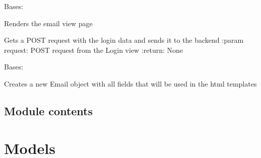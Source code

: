 \documentclass[letterpaper,10pt,english]{sphinxmanual}
\begin{document}

\begin{fulllineitems}
\label{push_email:push_email.views.EmailView}
Bases: 

Renders the email view page

\begin{fulllineitems}
\label{push_email:push_email.views.EmailView.post}
Gets a POST request with the login data and sends it to the backend
:param request: POST request from the Login view
:return: None

\end{fulllineitems}


\begin{fulllineitems}
\label{push_email:push_email.views.EmailView.template_name}
\end{fulllineitems}


\end{fulllineitems}


\begin{fulllineitems}
\label{push_email:push_email.views.FullEmail}
Bases: 

Creates a new Email object with all fields that will be used in the html templates

\end{fulllineitems}



\section{Module contents}
\label{push_email:module-contents}\label{push_email:module-push_email}

\chapter{Models}
\label{modules/models:models}\label{modules/models::doc}
\end{document}
